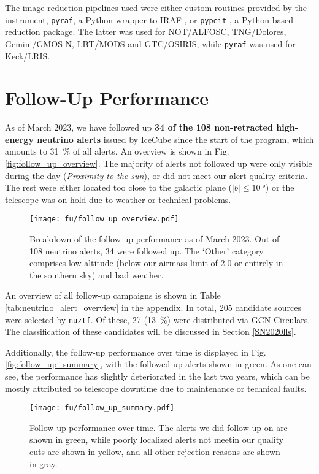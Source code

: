 The image reduction pipelines used were either custom routines provided by the instrument, \texttt{pyraf}, a Python wrapper to IRAF , or \texttt{pypeit} , a Python-based reduction package. The latter was used for NOT/ALFOSC, TNG/Dolores, Gemini/GMOS-N, LBT/MODS and GTC/OSIRIS, while \texttt{pyraf} was used for Keck/LRIS.

\section{Follow-Up Performance}
As of March 2023, we have followed up \textbf{34 of the 108 non-retracted high-energy neutrino alerts} issued by IceCube since the start of the program, which amounts to \SI{31}{\percent} of all alerts. An overview is shown in Fig. \ref{fig:follow_up_overview}. The majority of alerts not followed up were only visible during the day (\textit{Proximity to the sun}), or did not meet our alert quality criteria. The rest were either located too close to the galactic plane ($|b|\leq\SI{10}{\degree}$) or the telescope was on hold due to weather or technical problems.

\begin{figure}[h!]
    \texttt{[image: fu/follow\_up\_overview.pdf]}
    \caption[Follow-up performance]{Breakdown of the follow-up performance as of March 2023. Out of 108 neutrino alerts, 34 were followed up. The `Other' category comprises low altitude (below our airmass limit of 2.0 or entirely in the southern sky) and bad weather.}
\end{figure}

An overview of all follow-up campaigns is shown in Table \ref{tab:neutrino_alert_overview} in the appendix. 
In total, 205 candidate sources were selected by \texttt{nuztf}. Of these, 27 (\SI{13}{\percent}) were distributed via GCN Circulars. The classification of these candidates will be discussed in Section \ref{SN2020lls}.

Additionally, the follow-up performance over time is displayed in Fig. \ref{fig:follow_up_summary}, with the followed-up alerts shown in green. As one can see, the performance has slightly deteriorated in the last two years, which can be mostly attributed to telescope downtime due to maintenance or technical faults.

\begin{figure}[h!]
    \texttt{[image: fu/follow\_up\_summary.pdf]}
    \caption[Follow-up performance over time]{Follow-up performance over time. The alerts we did follow-up on are shown in green, while poorly localized alerts not meetin our quality cuts are shown in yellow, and all other rejection reasons are shown in gray.}
\end{figure}


